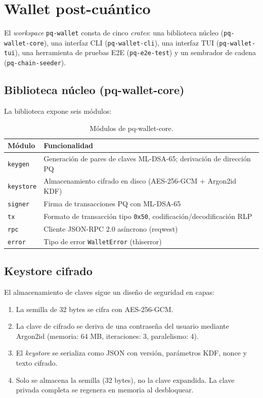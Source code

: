 \section{Wallet post-cuántico}
\label{sec:dev_wallet}

El \emph{workspace} \texttt{pq-wallet} consta de cinco \emph{crates}: una biblioteca núcleo (\texttt{pq-wallet-core}), una interfaz CLI (\texttt{pq-wallet-cli}), una interfaz TUI (\texttt{pq-wallet-tui}), una herramienta de pruebas E2E (\texttt{pq-e2e-test}) y un sembrador de cadena (\texttt{pq-chain-seeder}).

\subsection{Biblioteca núcleo (pq-wallet-core)}

La biblioteca expone seis módulos:

\begin{table}[htbp]
\centering
\caption{Módulos de pq-wallet-core.}
\label{tab:wallet_core}
\begin{tabular}{@{}lL{8cm}@{}}
\toprule
\textbf{Módulo} & \textbf{Funcionalidad} \\
\midrule
\texttt{keygen} & Generación de pares de claves ML-DSA-65; derivación de dirección PQ \\
\texttt{keystore} & Almacenamiento cifrado en disco (AES-256-GCM + Argon2id KDF) \\
\texttt{signer} & Firma de transacciones PQ con ML-DSA-65 \\
\texttt{tx} & Formato de transacción tipo \texttt{0x50}, codificación/decodificación RLP \\
\texttt{rpc} & Cliente JSON-RPC 2.0 asíncrono (reqwest) \\
\texttt{error} & Tipo de error \texttt{WalletError} (thiserror) \\
\bottomrule
\end{tabular}
\end{table}

\subsection{Keystore cifrado}

El almacenamiento de claves sigue un diseño de seguridad en capas:

\begin{enumerate}
  \item La semilla de 32 bytes se cifra con AES-256-GCM.
  \item La clave de cifrado se deriva de una contraseña del usuario mediante Argon2id (memoria: 64 MB, iteraciones: 3, paralelismo: 4).
  \item El \emph{keystore} se serializa como JSON con versión, parámetros KDF, nonce y texto cifrado.
  \item Solo se almacena la semilla (32 bytes), no la clave expandida. La clave privada completa se regenera en memoria al desbloquear.
\end{enumerate}

